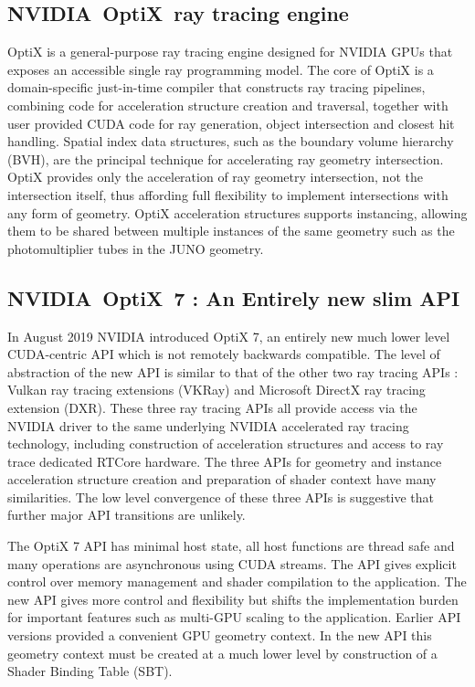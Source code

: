\documentclass{webofc}
\begin{document}
\subsection{NVIDIA\textregistered\ OptiX\texttrademark\ ray tracing engine}
%
OptiX is a general-purpose ray tracing engine
designed for NVIDIA GPUs that exposes an accessible single ray programming model.
The core of OptiX is a domain-specific just-in-time compiler that constructs 
ray tracing pipelines, combining code for acceleration structure creation and traversal, 
together with user provided CUDA code for ray generation, object intersection and closest hit handling.
Spatial index data structures, such as the boundary volume hierarchy (BVH), are the 
principal technique for accelerating ray geometry intersection.  
OptiX provides only the acceleration of ray geometry intersection, not the intersection itself,
thus affording full flexibility to implement intersections with any form of geometry. 
OptiX acceleration structures supports instancing, allowing them to be shared 
between multiple instances of the same geometry such as the photomultiplier tubes in the JUNO geometry.  

\subsection{NVIDIA\textregistered\ OptiX\texttrademark\ 7 : An Entirely new slim API}
%
In August 2019 NVIDIA introduced OptiX 7, an entirely new much lower level CUDA-centric API 
which is not remotely backwards compatible. 
The level of abstraction of the new API is similar to that of the other two ray tracing APIs : 
Vulkan ray tracing extensions (VKRay) and Microsoft DirectX ray tracing extension (DXR). 
These three ray tracing APIs all provide access via the NVIDIA driver to the same underlying NVIDIA 
accelerated ray tracing technology, including construction of acceleration structures and 
access to ray trace dedicated RTCore hardware. The three APIs for geometry and instance acceleration 
structure creation and preparation of shader context have many similarities.
The low level convergence of these three APIs is suggestive that further major API transitions 
are unlikely. 

The OptiX 7 API has minimal host state, all host functions are thread safe and many operations are asynchronous using CUDA streams.
The API gives explicit control over memory management and shader compilation to the application.
The new API gives more control and flexibility but shifts the implementation burden for important features 
such as multi-GPU scaling to the application.  Earlier API versions provided a convenient GPU geometry
context. In the new API this geometry context must be created at a much lower level by construction
of a Shader Binding Table (SBT). 
\end{document}
